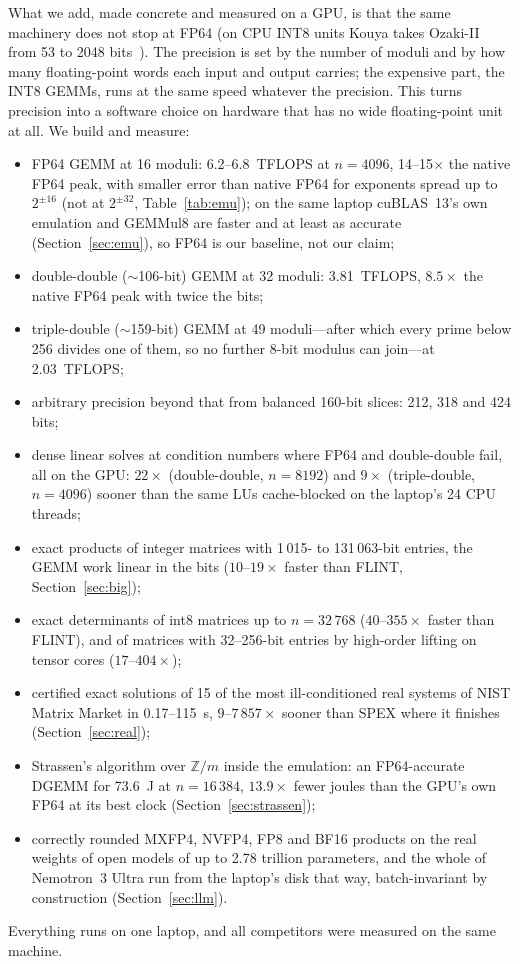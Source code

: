 \documentclass[11pt]{article}
\begin{document}
What we add, made concrete and measured on a GPU, is that the same machinery does not stop at FP64 (on CPU INT8 units Kouya
takes Ozaki-II from 53 to 2048 bits~\cite{ozamx}). The precision is
set by the number of moduli and by how many floating-point words each input and output carries; the expensive part, the
INT8 GEMMs, runs at the same speed whatever the precision. This turns precision into a software choice on hardware that has
no wide floating-point unit at all. We build and measure:
\begin{itemize}
\item FP64 GEMM at 16 moduli: 6.2--6.8~TFLOPS at $n=4096$, 14--15$\times$ the native FP64 peak, with smaller error than native
FP64 for exponents spread up to $2^{\pm16}$ (not at $2^{\pm32}$, Table~\ref{tab:emu}); on
the same laptop cuBLAS~13's own emulation and GEMMul8 are faster and at least as accurate (Section~\ref{sec:emu}), so FP64 is
our baseline, not our claim;
\item double-double ($\sim$106-bit) GEMM at 32 moduli: 3.81~TFLOPS, $8.5\times$ the native FP64 peak with twice the bits;
\item triple-double ($\sim$159-bit) GEMM at 49 moduli---after which every prime below 256 divides one of them, so no further
8-bit modulus can join---at 2.03~TFLOPS;
\item arbitrary precision beyond that from balanced 160-bit slices: 212, 318 and 424 bits;
\item dense linear solves at condition numbers where FP64 and double-double fail, all on the GPU: $22\times$ (double-double,
$n=8192$) and $9\times$ (triple-double, $n=4096$) sooner than the same LUs cache-blocked on the laptop's 24 CPU threads;
\item exact products of integer matrices with 1\,015- to 131\,063-bit entries, the GEMM work linear in the bits
($10$--$19\times$ faster than FLINT, Section~\ref{sec:big});
\item exact determinants of int8 matrices up to $n=32\,768$ ($40$--$355\times$ faster than FLINT), and of matrices with 32--256-bit entries by high-order lifting on tensor cores ($17$--$404\times$);
\item certified exact solutions of 15 of the most ill-conditioned real systems of NIST Matrix Market in 0.17--115~s,
$9$--$7\,857\times$ sooner than SPEX where it finishes (Section~\ref{sec:real});
\item Strassen's algorithm over $\mathbb{Z}/m$ inside the emulation: an FP64-accurate DGEMM for 73.6~J at $n=16\,384$,
$13.9\times$ fewer joules than the GPU's own FP64 at its best clock (Section~\ref{sec:strassen});
\item correctly rounded MXFP4, NVFP4, FP8 and BF16 products on the real weights of open models of up to 2.78 trillion
parameters, and the whole of Nemotron~3 Ultra run from the laptop's disk that way, batch-invariant by construction
(Section~\ref{sec:llm}).
\end{itemize}
Everything runs on one laptop, and all competitors were measured on the same machine.
\end{document}
